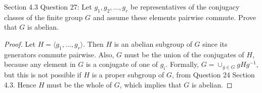 Section 4.3 Question 27: Let $g_1,g_2,\ldots,g_r$ be representatives of the
conjugacy classes of the finite group $G$ and assume these elements
pairwise commute. Prove that $G$ is abelian.

\begin{proof}
  Let $H=\langle g_1,\ldots,g_r\rangle$. Then $H$ is an abelian subgroup of
  $G$ since its generators commute pairwise. Also, $G$ must be the union of
  the conjugates of $H$, because any element in $G$ is a conjugate of one
  of $g_i$. Formally, $G=\cup_{g\in G}gHg^{-1}$, but this is not possible
  if $H$ is a proper subgroup of $G$, from Question 24 Section 4.3. Hence
  $H$ must be the whole of $G$, which implies that $G$ is abelian.
\end{proof}
